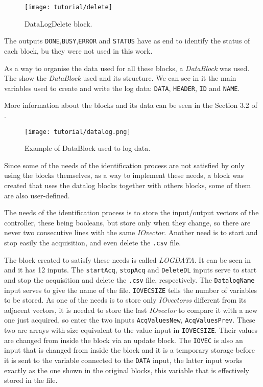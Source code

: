 \begin{figure}[H] \centering
 \texttt{[image: tutorial/delete]}
  \caption{DataLogDelete block.}
  \label{fig:datalogdelete}
\end{figure}
The outputs \verb|DONE|,\verb|BUSY|,\verb|ERROR| and \verb|STATUS| have as end
to identify the status of each block, bu they were not used in this work.

As a way to organise the data used for all these blocks, a \emph{DataBlock} was
used. The  show the \emph{DataBlock} used and its
structure. We can see in it the main variables used to create
and write the log data: \verb|DATA|, \verb|HEADER|, \verb|ID| and \verb|NAME|.

More information about the blocks and its data can be seen in the Section 3.2 of
\cite{datalogSiemens}.

\begin{figure}[H] \centering
 \texttt{[image: tutorial/datalog.png]}
  \caption{Example of DataBlock used to log data.}
  \label{fig:exampleDataBlock}
\end{figure}

Since some of the needs of the identification process are not satisfied by
only using the blocks themselves, as a way to implement these needs, a block was created
that uses the datalog blocks together with others blocks, some of them are also
user-defined.

The needs of the identification process is to store the input\slash output
vectors of the controller, these being booleans, but store only when they
change, so there are never two consecutive lines with the same \emph{IOvector}.
Another need is to start and stop easily the acquisition, and even delete the
\verb|.csv| file.

The block created to satisfy these needs is called \emph{LOGDATA}. It can be seen in
 and it has 12 inputs. The \verb|startAcq|,
\verb|stopAcq| and \verb|DeleteDL| inputs serve to start and stop the acquisition and
delete the \verb|.csv| file, respectively. The \verb|DatalogName| input serves
to give the name of the file. \verb|IOVECSIZE| tells the number of variables to
be stored. As one of the needs is to store only \emph{IOvectorss} different from its
adjacent vectors, it is needed to store the last \emph{IOvector} to compare it with a
new one just acquired, so enter the two inputs \verb|AcqValuesNew|,
\verb|AcqValuesPrev|. These two are arrays with size equivalent to the value
input in \verb|IOVECSIZE|. Their values are
changed from inside the block via an update block.
The \verb|IOVEC| is also an input that is changed from inside the block and it
is a temporary storage before it is sent to the variable connected to the
\verb|DATA| input, the latter input works exactly as the one shown in the
original blocks, this variable that is effectively stored in the file.

